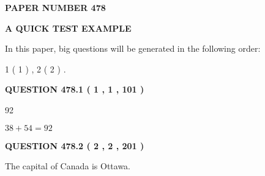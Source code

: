 \documentclass[12pt]{article}
\begin{document}
   
   
   
\newpage 
\setcounter{page}{ 
   478001 } 
   
   
   
   
 {\textbf{ \Large{ PAPER NUMBER  478  }}}
   
   
\vspace{0.2in}
   
   
   
   
   
   
 \vspace{0.2in}
{\LARGE {\textbf{ A QUICK TEST EXAMPLE}}}
   
   
   
\vspace{0.2in}
   
In this paper, big questions will be generated in the following order: 
   
   
   1 ( 1 )
 ,
   2 ( 2 )
 .
  
\vspace{0.2in}
  
{\textbf{\Large{QUESTION
478.1 
 ( 1 , 1 , 101 )
}}}
  
  
 
 
\noindent{}

92
 
 
 
 
\noindent{}

$ %
38 +  %
54=   %
92$
 
 
  
\vspace{0.2in}
  
{\textbf{\Large{QUESTION
478.2 
 ( 2 , 2 , 201 )
}}}
  
  
 
 
\noindent{}
 
 
The capital of Canada is Ottawa.
 
 
 
 
   
   
 \vspace{0.2in}
 
   
   
   
   
\end{document}
